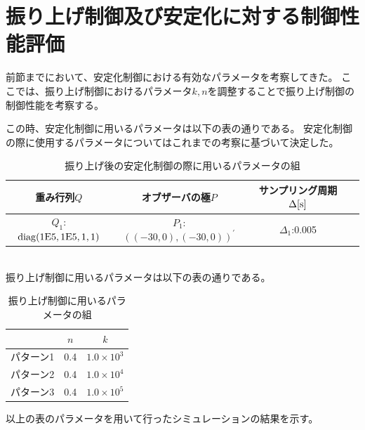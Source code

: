 \section{振り上げ制御及び安定化に対する制御性能評価}
	前節までにおいて、安定化制御における有効なパラメータを考察してきた。
	ここでは、振り上げ制御におけるパラメータ$k,n$を調整することで振り上げ制御の制御性能を考察する。
	\par
	この時、安定化制御に用いるパラメータは以下の表の通りである。
	安定化制御の際に使用するパラメータについてはこれまでの考察に基づいて決定した。
	\begin{table}[htb]
		\begin{center}
			\caption{振り上げ後の安定化制御の際に用いるパラメータの組}
			\medskip
			
			\begin{tabular}{|c|c|c|c|}\hline
				重み行列$Q$ & オブザーバの極$P$ & サンプリング周期$\Delta[\rm{s}]$ \\ \hline\hline
				$Q_1$:$\rm{diag}(1E5,1E5,1,1)$ & $P_1$:$((-30,0),(-30,0))^{'}$ & $\Delta_1$:0.005 \\ \hline
			\end{tabular}
		\end{center}
		\label{table:huriage_control}
	\end{table}
	\\
	振り上げ制御に用いるパラメータは以下の表の通りである。
	\begin{table}[htb]
		\begin{center}
			\caption{振り上げ制御に用いるパラメータの組}
			\medskip
			
			\begin{tabular}{|c|c|c|}\hline
				& $n$ & $k$ \\ \hline\hline
				パターン1 & 0.4 & $1.0×10^3$  \\ \hline
				パターン2 & 0.4 & $1.0×10^4$  \\ \hline
				パターン3 & 0.4 & $1.0×10^5$  \\ \hline
			\end{tabular}
		\end{center}
		\label{table:huriage_huriage}
	\end{table}
	以上の表のパラメータを用いて行ったシミュレーションの結果を示す。
	
	
	
	
	
